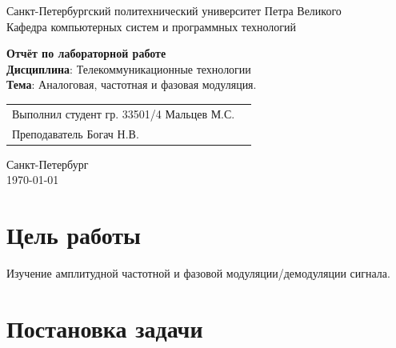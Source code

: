 \documentclass[a4paper,14pt]{extarticle}
\begin{document}
\begin{titlepage}
\centering
Санкт-Петербургский политехнический университет Петра Великого \\
\vspace{0.15cm}
Кафедра компьютерных систем и программных технологий \\
\vspace{6.5cm}

{\centering \textbf{Отчёт по лабораторной работе} \\ 
\vspace{0.15cm}
\textbf{Дисциплина}: Телекоммуникационные технологии \\
\vspace{0.15cm}
\textbf{Тема}: Аналоговая, частотная и фазовая модуляция.} \\


\vspace{6.5cm}

\begin{table}[H]
\begin{tabular}{p{\textwidth}@{}r}
{Выполнил студент гр. 33501/4} \hfill {Мальцев  М.С.} \\
{Преподаватель} \hfill {Богач Н.В.} \\
\end{tabular}
\end{table}
\vfill

{\centering Санкт-Петербург \\ 
\vspace{0.15cm}
\today}
\end{titlepage}

\tableofcontents
\newpage

\section{Цель работы}

Изучение амплитудной частотной и фазовой модуляции/демодуляции сигнала.

\section{Постановка задачи}
\end{document}
